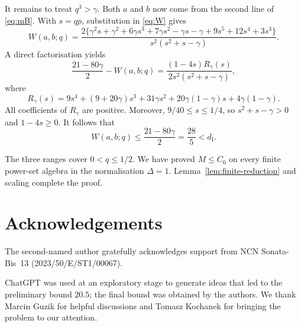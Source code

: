 \documentclass[11pt,a4paper]{amsart}
\begin{document}
It remains to treat \(q^3>\gamma\).  Both \(a\) and \(b\) now come from the
second line of \eqref{eq:mB}.  With \(s=qp\), substitution in
\eqref{eq:W} gives
\[
 W(a,b;q)=
 \frac{2\{\gamma^2s+\gamma^2+6\gamma s^3+7\gamma s^2-\gamma s-\gamma
       +9s^5+12s^4+3s^3\}}
 {s^2(s^2+s-\gamma)}.
\]
A direct factorisation yields
\begin{equation}\label{eq:gamma-factorisation}
 \frac{21-80\gamma}{2}-W(a,b;q)
 =
 \frac{(1-4s)R_\gamma(s)}
 {2s^2(s^2+s-\gamma)},
\end{equation}
where
\[
 R_\gamma(s)=9s^4+(9+20\gamma)s^3+31\gamma s^2
 +20\gamma(1-\gamma)s+4\gamma(1-\gamma).
\]
All coefficients of \(R_\gamma\) are positive.  Moreover,
\(9/40\leqslant s\leqslant1/4\), so \(s^2+s-\gamma>0\) and
\(1-4s\geqslant0\).  It follows that
\[
        W(a,b;q)\leqslant\frac{21-80\gamma}{2}
        =\frac{28}{5}<d_{\mathrm I}.
\]

The three ranges cover \(0<q\leqslant1/2\).  We have proved
\(M\leqslant C_0\) on every finite power-set algebra in the normalisation
\(\Delta=1\).  Lemma~\ref{lem:finite-reduction} and scaling complete the
proof.

\section*{Acknowledgements}

The second-named author gratefully acknowledges support from NCN Sonata-Bis~13
(2023/50/E/ST1/00067).

ChatGPT was used at an exploratory stage to generate ideas that led to the
preliminary bound \(20.5\); the final bound was obtained by the authors.  We
thank Marcin Guzik for helpful discussions and Tomasz Kochanek for bringing the
problem to our attention.
\end{document}

